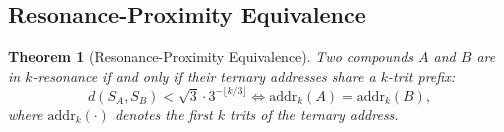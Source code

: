 \documentclass[11pt,twocolumn,a4paper]{article}
\newtheorem{theorem}{Theorem}[section]
\theoremstyle{definition}
\theoremstyle{remark}
\begin{document}
\subsection{Resonance-Proximity Equivalence}\label{sec:resonance-proximity}

\begin{theorem}[Resonance-Proximity Equivalence]\label{thm:resonance-proximity}
Two compounds $A$ and $B$ are in $k$-resonance if and only if their ternary addresses share a $k$-trit prefix:
\begin{equation}\label{eq:resonance-prefix}
  d(S_A, S_B) < \sqrt{3} \cdot 3^{-\lfloor k/3 \rfloor} \iff \mathrm{addr}_k(A) = \mathrm{addr}_k(B),
\end{equation}
where $\mathrm{addr}_k(\cdot)$ denotes the first $k$ trits of the ternary address.
\end{theorem}
\end{document}
